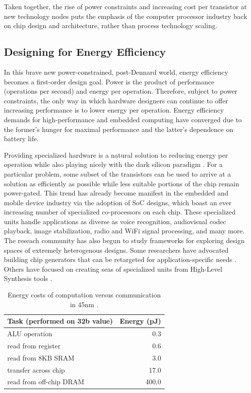 Taken together, the rise of power constraints and increasing cost per transistor at new technology nodes
puts the emphasis of the computer processor industry back on chip design and architecture, rather than process technology scaling.

\subsection{Designing for Energy Efficiency}

In this brave new power-constrained, post-Dennard world, energy efficiency becomes a first-order design goal.
Power is the product of performance (operations per second) and energy per operation.
Therefore, subject to power constraints, the only way in which hardware designers can continue to offer increasing performance is to lower energy per operation.
Energy efficiency demands for high-performance and embedded computing have converged due to the former's hunger for maximal performance and the latter's dependence on battery life.

Providing specialized hardware is a natural solution to reducing energy per operation while also playing nicely with the dark silicon paradigm \cite{esmaeilzadeh2011dark}.
For a particular problem, some subset of the transistors can be used to arrive at a solution as efficiently as possible while less suitable portions of the chip remain power-gated.
This trend has already become manifest in the embedded and mobile device industry via the adoption of SoC designs, which boast an ever increasing number of specialized co-processors on each chip.
These specialized units handle applications as diverse as voice recognition, audiovisual codec playback, image stabilization, radio and WiFi signal processing, and many more.
The reseach community has also begun to study frameworks for exploring design spaces of extremely heterogenous designs.
Some researchers have advocated building chip generators that can be retargeted for application-specific needs \cite{shacham-micro10}.
Others have focused on creating seas of specialized units from High-Level Synthesis tools \cite{shao2014aladdin, Venkatesh:2010}.

\begin{table}[tdp]
\begin{center}
\begin{tabular}{|l|r|} 
\hline
Task (performed on 32b value) & Energy (pJ) \\ \hline
ALU operation & 0.3 \\ \hline
read from register & 0.6 \\ \hline
read from 8KB SRAM & 3.0 \\ \hline
transfer across chip & 17.0 \\ \hline
read from off-chip DRAM & 400.0 \\ \hline
\end{tabular}
\end{center}
\caption{Energy costs of computation versus communication in 45nm \cite{dally-hpca02}. }
\label{tab:movement}
\end{table}

